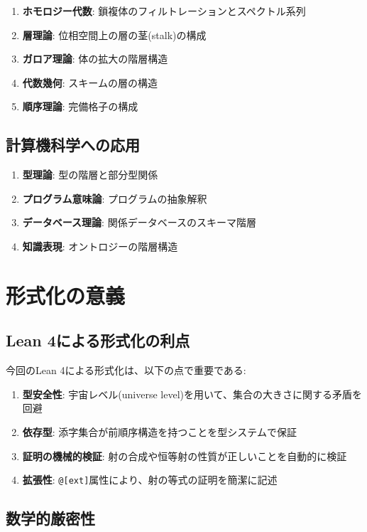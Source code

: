 \documentclass[a4paper,12pt]{article}
\theoremstyle{definition}
\begin{document}
\begin{enumerate}
\item \textbf{ホモロジー代数}: 鎖複体のフィルトレーションとスペクトル系列
\item \textbf{層理論}: 位相空間上の層の茎(stalk)の構成
\item \textbf{ガロア理論}: 体の拡大の階層構造
\item \textbf{代数幾何}: スキームの層の構造
\item \textbf{順序理論}: 完備格子の構成
\end{enumerate}

\subsection{計算機科学への応用}

\begin{enumerate}
\item \textbf{型理論}: 型の階層と部分型関係
\item \textbf{プログラム意味論}: プログラムの抽象解釈
\item \textbf{データベース理論}: 関係データベースのスキーマ階層
\item \textbf{知識表現}: オントロジーの階層構造
\end{enumerate}

\section{形式化の意義}

\subsection{Lean 4による形式化の利点}

今回のLean 4による形式化は、以下の点で重要である:

\begin{enumerate}
\item \textbf{型安全性}: 宇宙レベル(universe level)を用いて、集合の大きさに関する矛盾を回避
\item \textbf{依存型}: 添字集合が前順序構造を持つことを型システムで保証
\item \textbf{証明の機械的検証}: 射の合成や恒等射の性質が正しいことを自動的に検証
\item \textbf{拡張性}: \texttt{@[ext]}属性により、射の等式の証明を簡潔に記述
\end{enumerate}

\subsection{数学的厳密性}
\end{document}
